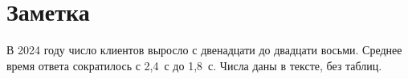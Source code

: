 \section{Заметка}
В 2024 году число клиентов выросло с двенадцати до двадцати восьми.
Среднее время ответа сократилось с 2{,}4~с до 1{,}8~с.
Числа даны в тексте, без таблиц.
